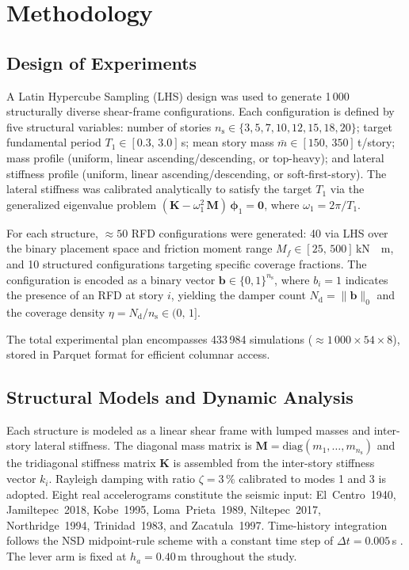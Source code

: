 \documentclass[preprint,12pt,authoryear]{elsarticle}
\newcommand{\nd}{N_{\mathrm{d}}}               %
\newcommand{\np}{n_{\mathrm{s}}}               %
\newcommand{\etad}{\eta}                        %
\newcommand{\Mf}{M_{\!f}}                      %
\newcommand{\ha}{h_a}                          %
\newcommand{\KM}{\,\si{kN{\cdot}m}}
\begin{document}
\section{Methodology}
\label{sec:method}

\subsection{Design of Experiments}
\label{sec:method:doe}

A Latin Hypercube Sampling (LHS) design \citep{McKay1979} was used to generate
1\,000 structurally diverse shear-frame configurations. Each configuration is
defined by five structural variables: number of stories $\np \in \{3, 5, 7,
10, 12, 15, 18, 20\}$; target fundamental period $T_1 \in [0.3,\,3.0]$\,s;
mean story mass $\bar{m} \in [150,\,350]$\,t/story; mass profile (uniform,
linear ascending/descending, or top-heavy); and lateral stiffness profile
(uniform, linear ascending/descending, or soft-first-story). The lateral
stiffness was calibrated analytically to satisfy the target $T_1$ via the
generalized eigenvalue problem $(\bm{K} - \omega_1^2\,\bm{M})\,\bm{\phi}_1 =
\bm{0}$, where $\omega_1 = 2\pi/T_1$.

For each structure, $\approx 50$ RFD configurations were generated: 40 via LHS
over the binary placement space and friction moment range
$\Mf \in [25,\,500]$\KM, and 10 structured configurations targeting specific
coverage fractions. The configuration is encoded as a binary vector
$\bm{b} \in \{0,1\}^{\np}$, where $b_i = 1$ indicates the presence of an RFD
at story $i$, yielding the damper count $\nd = \|\bm{b}\|_0$ and the coverage
density $\etad = \nd/\np \in (0,\,1]$.

The total experimental plan encompasses 433\,984 simulations
($\approx\!1\,000 \times 54 \times 8$), stored in Parquet format for
efficient columnar access.

\subsection{Structural Models and Dynamic Analysis}
\label{sec:method:model}

Each structure is modeled as a linear shear frame with lumped masses and
inter-story lateral stiffness. The diagonal mass matrix is
$\bm{M} = \mathrm{diag}(m_1,\ldots,m_{\np})$ and the tridiagonal stiffness
matrix $\bm{K}$ is assembled from the inter-story stiffness vector $k_i$.
Rayleigh damping with ratio $\zeta = 3\,\%$ calibrated to modes 1 and 3 is
adopted. Eight real accelerograms constitute the seismic input:
El~Centro~1940, Jamiltepec~2018, Kobe~1995, Loma~Prieta~1989, Niltepec~2017,
Northridge~1994, Trinidad~1983, and Zacatula~1997. Time-history integration
follows the NSD midpoint-rule scheme with a constant time step of
$\Delta t = 0.005$\,s \citep{Namorado2024}. The lever arm is fixed at
$\ha = 0.40$\,m throughout the study.
\end{document}
